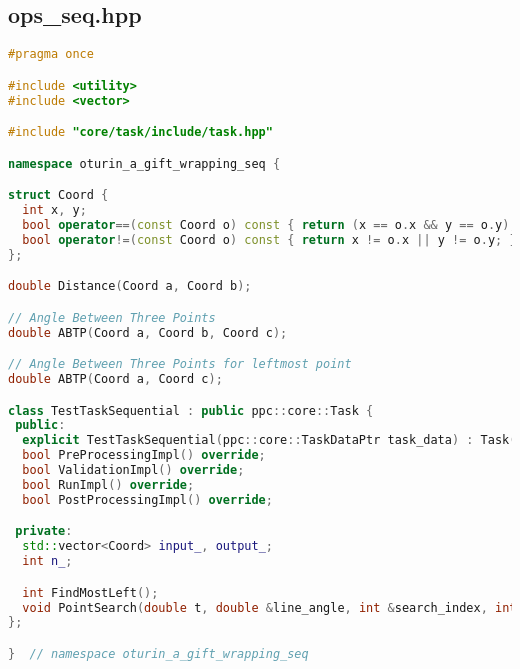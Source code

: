 \documentclass[12pt,a4paper]{extarticle}
\begin{document}
\subsection{ops\_seq.hpp}
\label{sec:seq.hpp}
\begin{lstlisting}[language=C++]
#pragma once

#include <utility>
#include <vector>

#include "core/task/include/task.hpp"

namespace oturin_a_gift_wrapping_seq {

struct Coord {
  int x, y;
  bool operator==(const Coord o) const { return (x == o.x && y == o.y); }
  bool operator!=(const Coord o) const { return x != o.x || y != o.y; }
};

double Distance(Coord a, Coord b);

// Angle Between Three Points
double ABTP(Coord a, Coord b, Coord c);

// Angle Between Three Points for leftmost point
double ABTP(Coord a, Coord c);

class TestTaskSequential : public ppc::core::Task {
 public:
  explicit TestTaskSequential(ppc::core::TaskDataPtr task_data) : Task(std::move(task_data)) {}
  bool PreProcessingImpl() override;
  bool ValidationImpl() override;
  bool RunImpl() override;
  bool PostProcessingImpl() override;

 private:
  std::vector<Coord> input_, output_;
  int n_;

  int FindMostLeft();
  void PointSearch(double t, double &line_angle, int &search_index, int i);
};

}  // namespace oturin_a_gift_wrapping_seq
\end{lstlisting}
\end{document}
